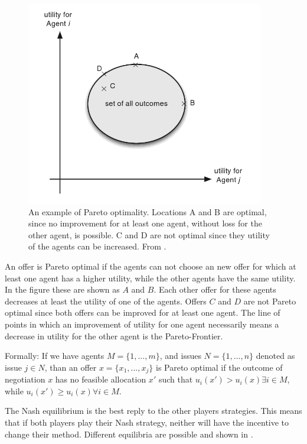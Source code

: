 \begin{figure}[h]
	\centering
	\includegraphics[width=0.7\linewidth]{img/parito_optimal.png}
	\caption{An example of Pareto optimality. Locations A and B are optimal, since no improvement for at least one agent, without loss for the other agent, is possible. C and D are not optimal since they utility of the agents can be increased. From \citet{fatima2014principles}.}
	\label{fig:paritooptimal}
\end{figure}

An offer is Pareto optimal if the agents can not choose an new offer for which at least one agent has a higher utility, while the other agents have the same utility. In the figure these are shown as $A$ and $B$. Each other offer for these agents decreases at least the utility of one of the agents. Offers $C$ and $D$ are not Pareto optimal since both offers can be improved for at least one agent. The line of points in which an improvement of utility for one agent necessarily means a decrease in utility for the other agent is the Pareto-Frontier. 

Formally: If we have agents $M = \{1,...,m\}$, and issues $N = \{1,...,n\}$ denoted as issue $j\in N$, than an offer $x = \{x_1, ..., x_j\}$ is Pareto optimal if the outcome of negotiation $x$ has no feasible allocation $x'$ such that $u_i(x')> u_i(x) \exists i \in M$, while $u_i(x')\geq u_i(x) \forall i \in M$. 

The Nash equilibrium is the best reply to the other players strategies. This means that if both players play their Nash strategy, neither will have the incentive to change their method. Different equilibria are possible and shown in . 

